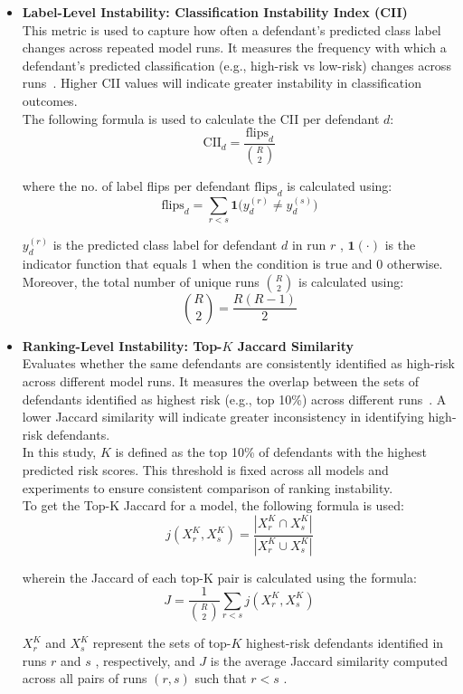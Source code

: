 \documentclass[12pt]{article}
\begin{document}
\begin{itemize}
  \item \textbf{Label-Level Instability: Classification Instability Index (CII)}\\ 
    \tab This metric is used to capture how often a defendant's predicted class label changes across repeated model runs. It measures the frequency with which a defendant's predicted classification (e.g., high-risk vs low-risk) changes across runs~\cite{riley2023stability}. Higher CII values will indicate greater instability in classification outcomes.\\

    The following formula is used to calculate the CII per defendant $ d $:
    \[ \text{CII}_d = \frac{\text{flips}_d}{\binom{R}{2}} \]

    where the no. of label flips per defendant $ \text{flips}_d $ is calculated using:
    \[ \text{flips}_d = \sum_{r<s} \mathbf{1}\big(y_d^{(r)} \ne y_d^{(s)}\big) \]
    
    $ y_d^{(r)} $ is the predicted class label for defendant $ d $ in run $ r $ , $ \mathbf{1}(\cdot) $ is the indicator function that equals 1 when the condition is true and 0 otherwise. \\

    Moreover, the total number of unique runs $ \binom{R}{2} $ is calculated using:
    \[ \binom{R}{2} = \frac{R(R-1)}{2} \] 

  \item \textbf{Ranking-Level Instability: Top-$ K$ Jaccard Similarity} \\
    \tab Evaluates whether the same defendants are consistently identified as high-risk across different model runs. It measures the overlap between the sets of defendants identified as highest risk (e.g., top 10\%) across different runs~\cite{lopez2022instability}. A lower Jaccard similarity will indicate greater inconsistency in identifying high-risk defendants.\\

    In this study, $K$ is defined as the top 10\% of defendants with the highest predicted risk scores. This threshold is fixed across all models and experiments to ensure consistent comparison of ranking instability.\\

    To get the Top-K Jaccard for a model, the following formula is used:
    \[ j(X_r^K,X_s^K)=\frac{|X_r^K \cap X_s^K|}{|X_r^K \cup X_s^K|} \]

    wherein the Jaccard of each top-K pair is calculated using the formula:
    \[ J=\frac{1}{\binom{R}{2}}\sum_{r<s}j(X_r^K,X_s^K) \]

    $ X_r^K $ and $ X_s^K $ represent the sets of top-$ K$ highest-risk defendants identified in runs $ r $ and $ s $ , respectively, and $ J $ is the average Jaccard similarity computed across all pairs of runs $ (r,s) $ such that $ r < s $ .
\end{itemize}
\end{document}
